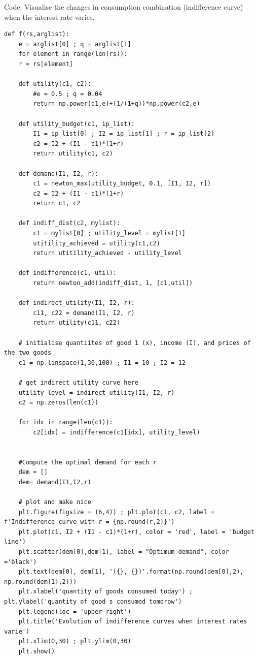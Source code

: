 \documentclass[a4paper, 12pt, reqno]{article}
\begin{document}
Code: Visualise the changes in consumption combination (indifference curve) when the interest rate varies. 
\begin{lstlisting}[frame=single]
def f(rs,arglist):
    e = arglist[0] ; q = arglist[1]
    for element in range(len(rs)):
    r = rs[element]

    def utility(c1, c2):
        #e = 0.5 ; q = 0.04
        return np.power(c1,e)+(1/(1+q))*np.power(c2,e)

    def utility_budget(c1, ip_list):
        I1 = ip_list[0] ; I2 = ip_list[1] ; r = ip_list[2]
        c2 = I2 + (I1 - c1)*(1+r)
        return utility(c1, c2)
        
    def demand(I1, I2, r):
        c1 = newton_max(utility_budget, 0.1, [I1, I2, r])
        c2 = I2 + (I1 - c1)*(1+r)
        return c1, c2

    def indiff_dist(c2, mylist): 
        c1 = mylist[0] ; utility_level = mylist[1]
        utitility_achieved = utility(c1,c2)
        return utitility_achieved - utility_level

    def indifference(c1, util):
        return newton_add(indiff_dist, 1, [c1,util])

    def indirect_utility(I1, I2, r):
        c11, c22 = demand(I1, I2, r)
        return utility(c11, c22)

    # initialise quantiites of good 1 (x), income (I), and prices of the two goods
    c1 = np.linspace(1,30,100) ; I1 = 10 ; I2 = 12

    # get indirect utility curve here
    utility_level = indirect_utility(I1, I2, r)
    c2 = np.zeros(len(c1))

    for idx in range(len(c1)):
        c2[idx] = indifference(c1[idx], utility_level)


    #Compute the optimal demand for each r
    dem = []
    dem= demand(I1,I2,r)    

    # plot and make nice
    plt.figure(figsize = (6,4)) ; plt.plot(c1, c2, label = f'Indifference curve with r = {np.round(r,2)}')
    plt.plot(c1, I2 + (I1 - c1)*(1+r), color = 'red', label = 'budget line')
    plt.scatter(dem[0],dem[1], label = "Optimum demand", color ='black')
    plt.text(dem[0], dem[1], '({}, {})'.format(np.round(dem[0],2), np.round(dem[1],2)))
    plt.xlabel('quantity of goods consumed today') ; plt.ylabel('quantity of good s consumed tomorow')
    plt.legend(loc = 'upper right')
    plt.title('Evolution of indifference curves when interest rates varie')
    plt.xlim(0,30) ; plt.ylim(0,30)
    plt.show()

\end{lstlisting} 
\end{document}
